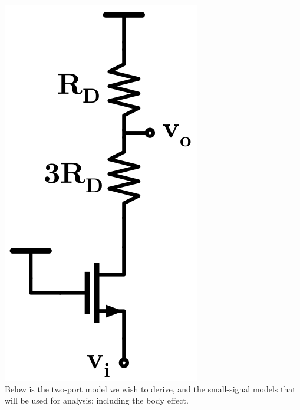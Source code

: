 \documentclass[12pt, fleqn]{article}
\begin{document}
\begin{enumerate}[label=(\alph*)]
{    \includegraphics[scale=0.25, center]{p2c.png}\\
    Below is the two-port model we wish to derive, and the small-signal models that will be used for analysis; including the body effect.
    
}
\end{enumerate}
\end{document}
